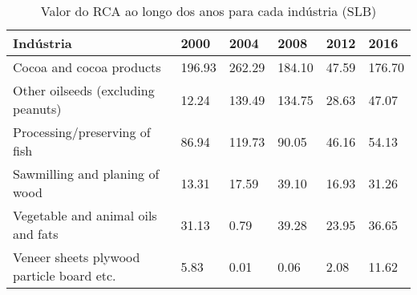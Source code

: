 \begin{table}
\centering
\caption{Valor do RCA ao longo dos anos para cada indústria (SLB)}
\label{tab:ex3-tempo-SLB}
\begin{tabular}{p{6cm}p{1.5cm}p{1.5cm}p{1.5cm}p{1.5cm}p{1.5cm}}
\toprule
                                Indústria &   2000 &   2004 &   2008 &  2012 &   2016 \\
\midrule
                 Cocoa and cocoa products & 196.93 & 262.29 & 184.10 & 47.59 & 176.70 \\
       Other oilseeds (excluding peanuts) &  12.24 & 139.49 & 134.75 & 28.63 &  47.07 \\
            Processing/preserving of fish &  86.94 & 119.73 &  90.05 & 46.16 &  54.13 \\
           Sawmilling and planing of wood &  13.31 &  17.59 &  39.10 & 16.93 &  31.26 \\
       Vegetable and animal oils and fats &  31.13 &   0.79 &  39.28 & 23.95 &  36.65 \\
Veneer sheets plywood particle board etc. &   5.83 &   0.01 &   0.06 &  2.08 &  11.62 \\
\bottomrule
\end{tabular}
\end{table}

